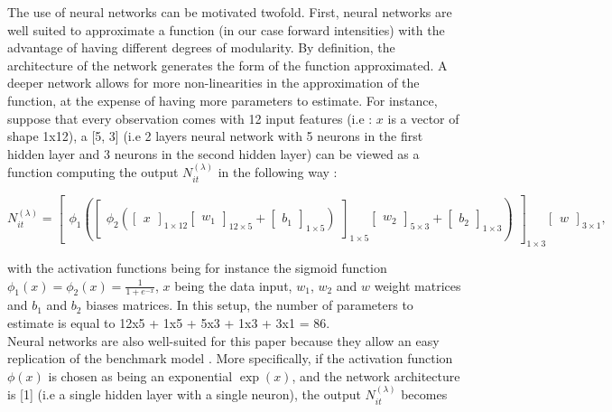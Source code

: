 The use of neural networks can be motivated twofold. First, neural networks are well suited to approximate a function (in our case forward intensities) with the advantage of having different degrees of modularity. By definition, the architecture of the network generates the form of the function approximated. A deeper network allows for more non-linearities in the approximation of the function, at the expense of having more parameters to estimate. For instance, suppose that every observation comes with 12 input features (i.e : $x$ is a vector of shape 1x12), a [5, 3] (i.e 2 layers neural network with 5 neurons in the first hidden layer and 3 neurons in the second hidden layer) can be viewed as a function computing the output $N_{it}^{(\lambda)}$ in the following way :


\begin{equation*}
N_{it}^{(\lambda)} =  \begin{bmatrix}
\phi_1 (\begin{bmatrix}
\phi_2 (\begin{bmatrix}
x
\end{bmatrix}_{1\times 12} 
\begin{bmatrix}
w_1
\end{bmatrix}_{12\times 5} + 
\begin{bmatrix}
b_1
\end{bmatrix}_{1\times 5})
\end{bmatrix}_{1 \times 5 } 
\begin{bmatrix}
w_2
\end{bmatrix}_{5 \times 3} + 
\begin{bmatrix}
b_2
\end{bmatrix}_{1 \times 3})
\end{bmatrix}_{1 \times 3} 
\begin{bmatrix}
w
\end{bmatrix}_{3 \times 1},
\end{equation*}


\noindent  with the activation functions being for instance the sigmoid function $\phi_1(x) = \phi_2(x) = \frac{1}{1+e^{-x}}$, $x$ being the data input, $w_1$, $w_2$ and $w$ weight matrices and $b_1$ and $b_2$ biases matrices. In this setup, the number of parameters to estimate is equal to 12x5 + 1x5 + 5x3 + 1x3 + 3x1 = 86. \\
Neural networks are also well-suited for this paper because they allow an easy replication of the benchmark model \citet{Duan2012}. More specifically, if the activation function $\phi(x)$ is chosen as being an exponential $\exp(x)$, and the network architecture is [1] (i.e a single hidden layer with a single neuron), the output $N_{it}^{(\lambda)}$ becomes

